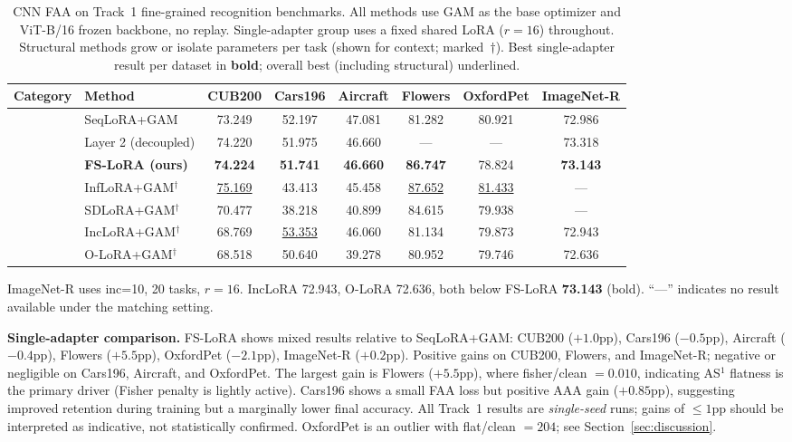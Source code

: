 \begin{table}[t]
\caption{CNN FAA on Track~1 fine-grained recognition benchmarks.
All methods use GAM as the base optimizer and ViT-B/16 frozen backbone, no replay.
Single-adapter group uses a fixed shared LoRA ($r=16$) throughout.
Structural methods grow or isolate parameters per task (shown for context; marked~$\dagger$).
Best single-adapter result per dataset in \textbf{bold};
overall best (including structural) underlined.}
\label{tab:main}
\centering
\small
\begin{tabular}{llcccccc}
\toprule
Category & Method & CUB200 & Cars196 & Aircraft & Flowers & OxfordPet & ImageNet-R \\
\midrule
{}
  & SeqLoRA+GAM      & 73.249 & 52.197 & 47.081 & 81.282 & 80.921 & 72.986 \\
  & Layer 2 (decoupled) & 74.220 & 51.975 & 46.660 & ---    & ---    & 73.318 \\
  & \textbf{FS-LoRA (ours)} & \textbf{74.224} & \textbf{51.741} & \textbf{46.660} & \textbf{86.747} & 78.824 & \textbf{73.143} \\
\midrule
{}
  & InfLoRA+GAM$^\dagger$  & \underline{75.169} & 43.413 & 45.458 & \underline{87.652} & \underline{81.433} & --- \\
  & SDLoRA+GAM$^\dagger$   & 70.477 & 38.218 & 40.899 & 84.615 & 79.938 & --- \\
  & IncLoRA+GAM$^\dagger$  & 68.769 & \underline{53.353} & 46.060 & 81.134 & 79.873 & 72.943 \\
  & O-LoRA+GAM$^\dagger$   & 68.518 & 50.640 & 39.278 & 80.952 & 79.746 & 72.636 \\
\bottomrule
\end{tabular}
\end{table}

\noindent\small{ImageNet-R uses inc=10, 20 tasks, $r=16$.
IncLoRA 72.943, O-LoRA 72.636, both below FS-LoRA \textbf{73.143} (bold).
``---'' indicates no result available under the matching setting.}

\textbf{Single-adapter comparison.}
FS-LoRA shows mixed results relative to SeqLoRA+GAM:
CUB200 ($+1.0$pp), Cars196 ($-0.5$pp), Aircraft ($-0.4$pp), Flowers ($+5.5$pp),
OxfordPet ($-2.1$pp), ImageNet-R ($+0.2$pp).
Positive gains on CUB200, Flowers, and ImageNet-R; negative or negligible on Cars196,
Aircraft, and OxfordPet.
The largest gain is Flowers ($+5.5$pp), where fisher/clean $=0.010$, indicating
AS$^1$ flatness is the primary driver (Fisher penalty is lightly active).
Cars196 shows a small FAA loss but positive AAA gain ($+0.85$pp), suggesting improved
retention during training but a marginally lower final accuracy.
All Track~1 results are \emph{single-seed} runs; gains of $\leq 1$pp should be
interpreted as indicative, not statistically confirmed.
OxfordPet is an outlier with flat/clean $=204$; see Section~\ref{sec:discussion}.

